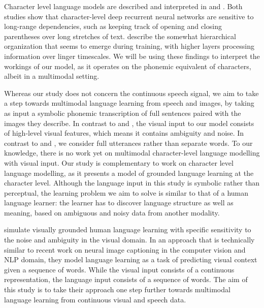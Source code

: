 Character level language models are described and interpreted in  and . Both studies show that character-level deep recurrent neural networks are sensitive to long-range dependencies, such as keeping track of opening and closing parentheses over long stretches of text.  describe the somewhat hierarchical organization that seems to emerge during training, with higher layers processing information over linger timescales. We will be using these findings to interpret the workings of our model, as it operates on the phonemic equivalent of characters, albeit in a multimodal setting. 

Whereas our study does not concern the continuous speech signal, we aim to take a step towards multimodal language learning from speech and images, by taking as input a symbolic phonemic transcription of full sentences paired with the images they describe. In contrast to  and , the visual input to our model consists of high-level visual features, which means it contains ambiguity and noise. In contrast to  and  , we consider full utterances rather than separate words. To our knowledge, there is no work yet on multimodal character-level language modelling with visual input. Our study is complementary to work on character level language modelling, as it presents a model of grounded language learning at the character level. Although the language input in this study is symbolic rather than perceptual, the learning problem we aim to solve is similar to that of a human language learner: the learner has to discover language structure as well as meaning, based on ambiguous and noisy data from another modality.  

 simulate visually grounded human language learning with specific sensitivity to the noise and ambiguity in the visual domain. In an approach that is technically similar to recent work on neural image captioning in the computer vision and NLP domain, they model language learning as a task of predicting visual context given a sequence of words. While the visual input consists of a continuous representation, the language input consists of a sequence of words. The aim of this study is to take their approach one step further towards multimodal language learning from continuous visual and speech data. 